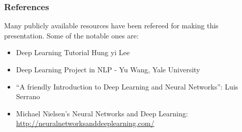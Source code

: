 \begin{frame}\frametitle{References}

Many publicly available resources have been refereed for making this presentation. Some of the notable ones are:
\begin{itemize}

\item Deep Learning Tutorial Hung yi Lee

\item Deep Learning Project in NLP - Yu Wang, Yale University
\item ``A friendly Introduction to Deep Learning and Neural Networks'': Luis Serrano
\item Michael Nielsen's Neural Networks and Deep Learning: \url{http://neuralnetworksanddeeplearning.com/}
\end{itemize}


\end{frame}